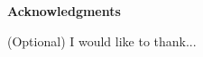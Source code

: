 \thispagestyle{empty}
\begin{center}
\textbf{Acknowledgments}
\end{center}

(Optional) I would like to thank...

\clearpage
